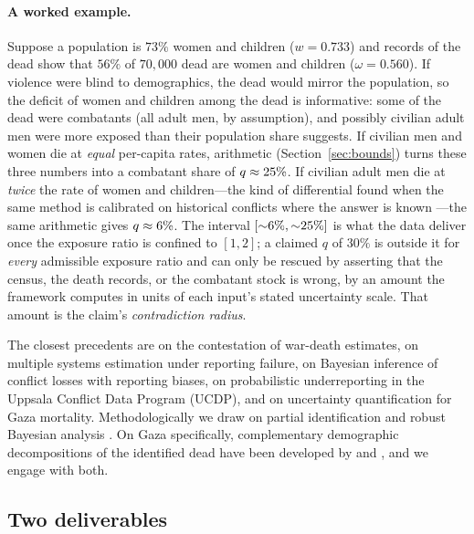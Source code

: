 \paragraph{A worked example.} Suppose a population is $73\%$ women and children ($w=0.733$) and records of the dead show that $56\%$ of $70{,}000$ dead are women and children ($\omega=0.560$). If violence were blind to demographics, the dead would mirror the population, so the deficit of women and children among the dead is informative: some of the dead were combatants (all adult men, by assumption), and possibly civilian adult men were more exposed than their population share suggests. If civilian men and women die at \emph{equal} per-capita rates, arithmetic (Section~\ref{sec:bounds}) turns these three numbers into a combatant share of $q\approx 25{}\%$. If civilian adult men die at \emph{twice} the rate of women and children---the kind of differential found when the same method is calibrated on historical conflicts where the answer is known \citep{frost2026}---the same arithmetic gives $q\approx 6{}\%$. The interval $[{\sim}6{}\%,{\sim}25{}\%]$ is what the data deliver once the exposure ratio is confined to $[1,2]$; a claimed $q$ of $30\%$ is outside it for \emph{every} admissible exposure ratio and can only be rescued by asserting that the census, the death records, or the combatant stock is wrong, by an amount the framework computes in units of each input's stated uncertainty scale. That amount is the claim's \emph{contradiction radius}.

The closest precedents are \citet{spagat2009} on the contestation of war-death estimates, \citet{lumpricebanks2013} on multiple systems estimation under reporting failure, \citet{radford2023} on Bayesian inference of conflict losses with reporting biases, \citet{vesco2026} on probabilistic underreporting in the Uppsala Conflict Data Program (UCDP), and \citet{gomez2025} on uncertainty quantification for Gaza mortality. Methodologically we draw on partial identification \citep{manski2003,manski2007,molinari2020,klinetamer2023} and robust Bayesian analysis \citep{huber1964,huber1981,berger1986}. On Gaza specifically, complementary demographic decompositions of the identified dead have been developed by \citet{cockerill2024} and \citet{frost2026}, and we engage with both.

\subsection{Two deliverables}

